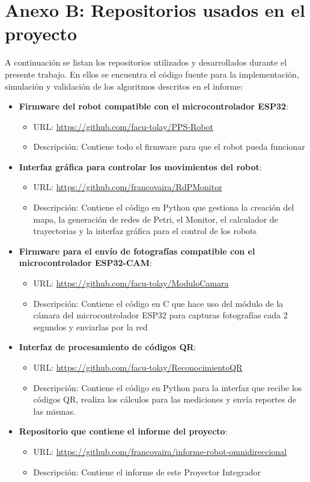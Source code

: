 \newpage
\section{Anexo B: Repositorios usados en el proyecto}

A continuación se listan los repositorios utilizados y desarrollados durante el presente trabajo. En ellos se encuentra el código fuente para la implementación, simulación y validación de los algoritmos descritos en el informe:

\begin{itemize}
  \item \textbf{Firmware del robot compatible con el microcontrolador ESP32}:
  \begin{itemize}
    \item URL: \url{https://github.com/facu-tolay/PPS-Robot}
    \item Descripción: Contiene todo el firmware para que el robot pueda funcionar
  \end{itemize}

    \item \textbf{Interfaz gráfica para controlar los movimientos del robot}:
  \begin{itemize}
    \item URL: \url{https://github.com/francovaira/RdPMonitor}
    \item Descripción: Contiene el código en Python que gestiona la creación del mapa, la generación de redes de Petri, el Monitor, el calculador de trayectorias y la interfaz gráfica para el control de los robots
  \end{itemize}

    \item \textbf{Firmware para el envío de fotografías compatible con el microcontrolador ESP32-CAM}:
  \begin{itemize}
    \item URL: \url{https://github.com/facu-tolay/ModuloCamara}
    \item Descripción: Contiene el código en C que hace uso del módulo de la cámara del microcontrolador ESP32 para capturas fotografías cada 2 segundos y enviarlas por la red
  \end{itemize}

    \item \textbf{Interfaz de procesamiento de códigos QR}:
  \begin{itemize}
    \item URL: \url{https://github.com/facu-tolay/ReconocimientoQR}
    \item Descripción: Contiene el código en Python para la interfaz que recibe los códigos QR, realiza los cálculos para las mediciones y envía reportes de las mismas.
  \end{itemize}

    \item \textbf{Repositorio que contiene el informe del proyecto}:
  \begin{itemize}
    \item URL: \url{https://github.com/francovaira/informe-robot-omnidireccional}
    \item Descripción: Contiene el informe de este Proyector Integrador
  \end{itemize}
\end{itemize}